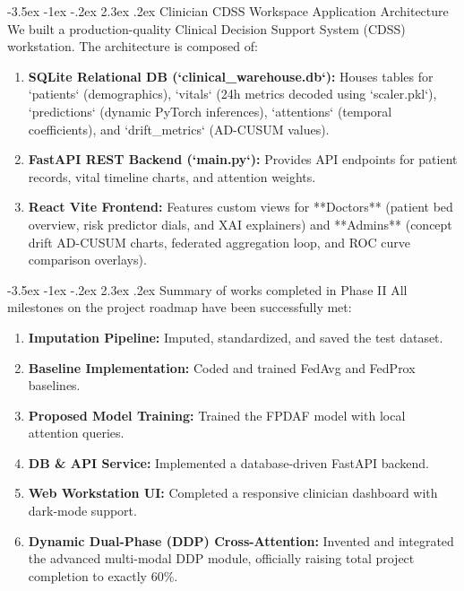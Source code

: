 \documentclass[11pt, a4paper]{article}
\makeatletter
\renewcommand\section{\@startsection {section}{1}{\z@}%
                                   {-3.5ex \@plus -1ex \@minus -.2ex}%
                                   {2.3ex \@plus.2ex}%
                                   {\normalfont\large\bfseries\color{amritaMaroon}}}
\makeatother
\begin{document}
\section{Clinician CDSS Workspace Application Architecture}
We built a production-quality Clinical Decision Support System (CDSS) workstation. The architecture is composed of:
\begin{enumerate}
    \item \textbf{SQLite Relational DB (`clinical\_warehouse.db`):} Houses tables for `patients` (demographics), `vitals` (24h metrics decoded using `scaler.pkl`), `predictions` (dynamic PyTorch inferences), `attentions` (temporal coefficients), and `drift\_metrics` (AD-CUSUM values).
    \item \textbf{FastAPI REST Backend (`main.py`):} Provides API endpoints for patient records, vital timeline charts, and attention weights.
    \item \textbf{React Vite Frontend:} Features custom views for **Doctors** (patient bed overview, risk predictor dials, and XAI explainers) and **Admins** (concept drift AD-CUSUM charts, federated aggregation loop, and ROC curve comparison overlays).
\end{enumerate}

\section{Summary of works completed in Phase II}
All milestones on the project roadmap have been successfully met:
\begin{enumerate}
    \item \textbf{Imputation Pipeline:} Imputed, standardized, and saved the test dataset.
    \item \textbf{Baseline Implementation:} Coded and trained FedAvg and FedProx baselines.
    \item \textbf{Proposed Model Training:} Trained the FPDAF model with local attention queries.
    \item \textbf{DB \& API Service:} Implemented a database-driven FastAPI backend.
    \item \textbf{Web Workstation UI:} Completed a responsive clinician dashboard with dark-mode support.
    \item \textbf{Dynamic Dual-Phase (DDP) Cross-Attention:} Invented and integrated the advanced multi-modal DDP module, officially raising total project completion to exactly 60\%.
\end{enumerate}
\end{document}
